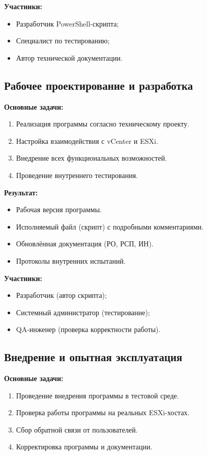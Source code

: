 \textbf{Участники:}
\begin{itemize}
    \item Разработчик PowerShell-скрипта;
    \item Специалист по тестированию;
    \item Автор технической документации.
\end{itemize}

\subsection{Рабочее проектирование и разработка}

\textbf{Основные задачи:}
\begin{enumerate}
    \item Реализация программы согласно техническому проекту.
    \item Настройка взаимодействия с vCenter и ESXi.
    \item Внедрение всех функциональных возможностей.
    \item Проведение внутреннего тестирования.
\end{enumerate}

\textbf{Результат:}
\begin{itemize}
    \item Рабочая версия программы.
    \item Исполняемый файл (скрипт) с подробными комментариями.
    \item Обновлённая документация (РО, РСП, ИН).
    \item Протоколы внутренних испытаний.
\end{itemize}

\textbf{Участники:}
\begin{itemize}
    \item Разработчик (автор скрипта);
    \item Системный администратор (тестирование);
    \item QA-инженер (проверка корректности работы).
\end{itemize}

\subsection{Внедрение и опытная эксплуатация}

\textbf{Основные задачи:}
\begin{enumerate}
    \item Проведение внедрения программы в тестовой среде.
    \item Проверка работы программы на реальных ESXi-хостах.
    \item Сбор обратной связи от пользователей.
    \item Корректировка программы и документации.
\end{enumerate}

